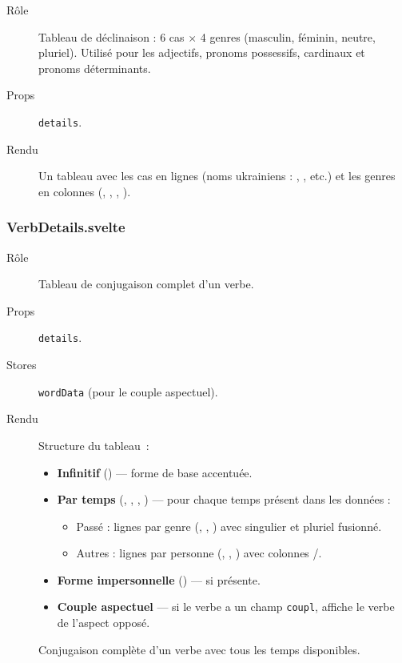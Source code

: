 \begin{description}
  \item[Rôle] Tableau de déclinaison : 6 cas $\times$ 4 genres (masculin, féminin, neutre, pluriel). Utilisé pour les adjectifs, pronoms possessifs, cardinaux et pronoms déterminants.
  \item[Props] \texttt{details}.
  \item[Rendu] Un tableau avec les cas en lignes (noms ukrainiens : , , etc.) et les genres en colonnes (, , , ).
\end{description}

\subsubsection{VerbDetails.svelte}

\begin{description}
  \item[Rôle] Tableau de conjugaison complet d'un verbe.
  \item[Props] \texttt{details}.
  \item[Stores] \texttt{wordData} (pour le couple aspectuel).
  \item[Rendu] Structure du tableau~:
  \begin{itemize}
    \item \textbf{Infinitif} () --- forme de base accentuée.
    \item \textbf{Par temps} (, , , ) --- pour chaque temps présent dans les données :
    \begin{itemize}
      \item Passé : lignes par genre (, , ) avec singulier et pluriel fusionné.
      \item Autres : lignes par personne (, , ) avec colonnes /.
    \end{itemize}
    \item \textbf{Forme impersonnelle} () --- si présente.
    \item \textbf{Couple aspectuel} --- si le verbe a un champ \texttt{coupl}, affiche le verbe de l'aspect opposé.
  \end{itemize}
\end{description}

\begin{figure}[ht]
  \centering
  \caption{Conjugaison complète d'un verbe avec tous les temps disponibles.}
  \label{fig:verb-conj}
\end{figure}

